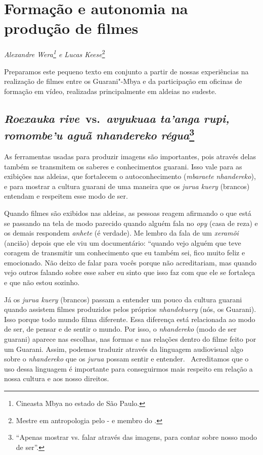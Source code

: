 \thispagestyle{empty}

\chapter*{Formação e autonomia na produção de filmes}


\begin{flushright}
\emph{Alexandre Wera\footnote{Cineasta Mbya no estado de São Paulo.} e Lucas
Keese}\footnote{Mestre em antropologia pelo - e membro do
.}
\end{flushright}
\medskip

\noindent Preparamos este pequeno texto em conjunto a partir de nossas
experiências na realização de filmes entre os Guarani"-Mbya e da
participação em oficinas de formação em vídeo, realizadas
principalmente em aldeias no sudeste.

\section{\emph{Roexauka rive}~vs.~\emph{avyukuaa ta’anga rupi, romombe’u aguã nhandereko régua}\protect\footnote[*]{``\uppercase{A}penas mostrar vs. falar através das imagens, para contar sobre nosso modo de ser''.}}{}

As ferramentas usadas para produzir imagens são importantes, pois
através delas também se transmitem os saberes e conhecimentos guarani.
Isso vale para as exibições nas aldeias, que fortalecem o
autoconhecimento (\emph{mbaraete nhandereko}), e para mostrar a cultura
guarani de uma maneira que os \emph{jurua kuery} (brancos) entendam e
respeitem esse modo de ser.

Quando filmes são exibidos nas aldeias, as pessoas reagem afirmando o
que está se passando na tela de modo parecido quando alguém fala no \emph{opy}
(casa de reza) e os demais respondem \emph{anhete} (é verdade). Me lembro da
fala de um \emph{xeramõi} (ancião) depois que ele viu um documentário: ``quando
vejo alguém que teve coragem de transmitir um conhecimento que eu
também sei, fico muito feliz e emocionado. Não deixo de falar para
vocês porque não acreditariam, mas quando vejo outros falando sobre
esse saber eu sinto que isso faz com que ele se fortaleça e que não
estou sozinho.

Já os \emph{jurua kuery} (brancos) passam a entender um pouco da cultura
guarani quando assistem filmes produzidos pelos próprios \emph{nhandekuery}
(nós, os Guarani). Isso porque todo mundo filma diferente. Essa
diferença está relacionada ao modo de ser, de pensar e de sentir o
mundo. Por isso, o \emph{nhandereko} (modo de ser guarani) aparece nas
escolhas, nas formas e nas relações dentro do filme feito por um
Guarani. Assim, podemos traduzir através da linguagem audiovisual algo
sobre o \emph{nhandereko} que os \emph{jurua} possam sentir e entender.~ Acreditamos
que o uso dessa linguagem é importante para conseguirmos mais respeito
em relação a nossa cultura e aos nosso direitos.

